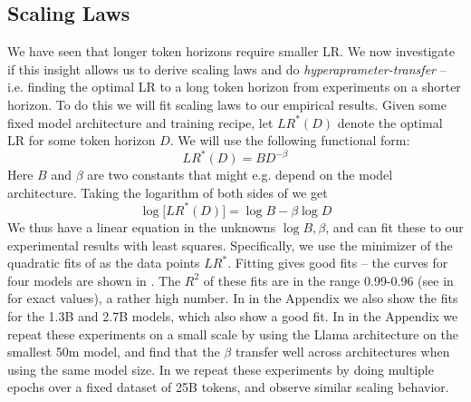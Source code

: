 \subsection{Scaling Laws}

\label{sec:scaling_laws}

We have seen that longer token horizons require smaller LR. We now investigate if this insight allows us to derive scaling laws and do \textit{hyperaprameter-transfer} -- i.e. finding the optimal LR to a long token horizon from experiments on a shorter horizon. To do this we will fit scaling laws to our empirical results. Given some fixed model architecture and training recipe, let ${LR}^*(D)$ denote the optimal LR for some token horizon $D$. We will use the following functional form:
\begin{equation}
\label{eq:powerlaw}
LR^*(D) = B D^{-\beta}
\end{equation}
Here $B$ and $\beta$ are two constants  that might e.g. depend on the model architecture. Taking the logarithm of both sides of  we get
\begin{equation}
\label{eq:logpowerlaw}
\log  \big[ LR^*(D) \big] = \log B  - \beta \log D
\end{equation}
We thus have a linear equation in the unknowns $\log B, \beta$, and can fit these to our experimental results with least squares. Specifically, we use the minimizer of the quadratic fits of  as the data points $LR^*$. Fitting  gives good fits -- the curves for four models are shown in . The $R^2$ of these fits are in the range 0.99-0.96 (see  in  for exact values), a rather high number. In  in the Appendix we also show the fits for the 1.3B and 2.7B models, which also show a good fit. In  in the Appendix we repeat these experiments on a small scale by using the Llama architecture on the smallest 50m model, and find that the $\beta$ transfer well across architectures when using the same model size.  In  we repeat these experiments by doing multiple epochs over a fixed dataset of 25B tokens, and observe similar scaling behavior.

